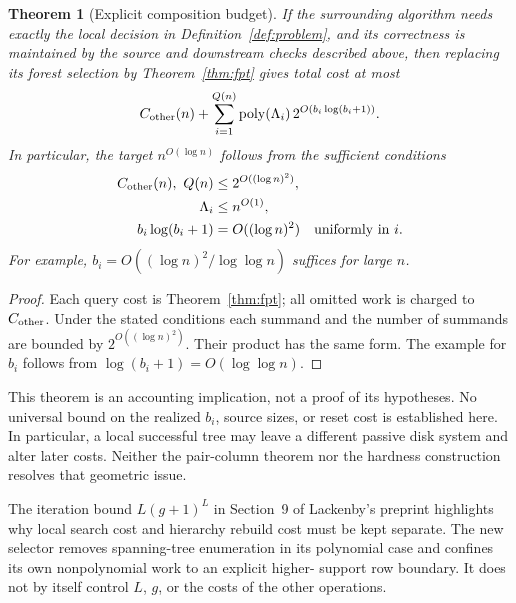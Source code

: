 \documentclass[11pt,letterpaper]{article}
\newtheorem{theorem}{Theorem}[section]
\theoremstyle{definition}
\theoremstyle{remark}
\DeclareMathOperator{\poly}{poly}
\begin{document}
\begin{theorem}[Explicit composition budget]\label{thm:composition}
If the surrounding algorithm needs exactly the local decision in
Definition~\ref{def:problem}, and its correctness is maintained by the source
and downstream checks described above, then replacing its forest selection by
Theorem~\ref{thm:fpt} gives total cost at most
\begin{equation}\label{eq:global-budget}
 C_{\rm other}(n)+\sum_{i=1}^{Q(n)}
       \poly(\Lambda_i)\,2^{O(b_i\log(b_i+1))}.
\end{equation}
In particular, the target $n^{O(\log n)}$ follows from the sufficient conditions
\begin{align}
 C_{\rm other}(n),\ Q(n)&\le 2^{O((\log n)^2)},\label{eq:cond-other}\\
 \Lambda_i&\le n^{O(1)},\label{eq:cond-size}\\
 b_i\log(b_i+1)&=O((\log n)^2)\quad\text{uniformly in }i.\label{eq:cond-b}
\end{align}
For example, $b_i=O((\log n)^2/\log\log n)$ suffices for large $n$.
\end{theorem}
\begin{proof}
Each query cost is Theorem~\ref{thm:fpt}; all omitted work is charged to
$C_{\rm other}$. Under the stated conditions each summand and the number of
summands are bounded by $2^{O((\log n)^2)}$. Their product has the same form.
The example for $b_i$ follows from $\log(b_i+1)=O(\log\log n)$.
\end{proof}

This theorem is an accounting implication, not a proof of its hypotheses.
No universal bound on the realized $b_i$, source sizes, or reset cost is established
here. In particular, a local successful tree may leave a different passive disk
system and alter later costs. Neither the pair-column theorem nor the hardness
construction resolves that geometric issue.

The iteration bound $L(g+1)^L$ in Section~9 of Lackenby's preprint
\cite{lackenby2026} highlights why local search cost and hierarchy rebuild cost
must be kept separate. The new selector removes spanning-tree enumeration in its
polynomial case and confines its own nonpolynomial work to an explicit higher-
support row boundary. It does not by itself control $L$, $g$, or the costs of the
other operations.
\end{document}
